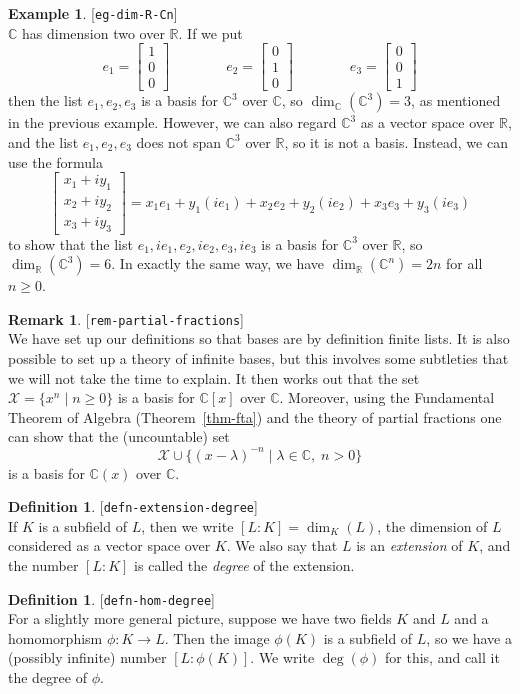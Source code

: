 \documentclass{amsart}
\newcommand{\lbl}[1]{\label{#1}\textup{[\texttt{#1}]}\ \\}
\newcommand{\lbl}{\label}
\newcommand{\R}         {{\mathbb{R}}}
\newcommand{\C}         {{\mathbb{C}}}
\newcommand{\lm}        {\lambda}
\newcommand{\CX}        {{\mathcal{X}}}
\newcommand{\bsm}       {\left[\begin{smallmatrix}}
\newcommand{\esm}       {\end{smallmatrix}\right]}
\newcommand{\st}        {\;|\;}
\renewcommand{\:}{\colon}
\theoremstyle{definition}
\newtheorem{remark}[theorem]{Remark}
\newtheorem{definition}[theorem]{Definition}
\newtheorem{example}[theorem]{Example}
\begin{document}
\begin{example}\lbl{eg-dim-R-Cn}
 $\C$ has dimension two over $\R$.  If we put 
 \[ e_1 = \bsm 1\\ 0\\ 0 \esm \hspace{4em}
    e_2 = \bsm 0\\ 1\\ 0 \esm \hspace{4em}
    e_3 = \bsm 0\\ 0\\ 1 \esm 
 \]
 then the list $e_1,e_2,e_3$ is a basis for $\C^3$ over $\C$, so
 $\dim_\C(\C^3)=3$, as mentioned in the previous example.  However,
 we can also regard $\C^3$ as a vector space over $\R$, and the list
 $e_1,e_2,e_3$ does not span $\C^3$ over $\R$, so it is not a basis.
 Instead, we can use the formula
 \[ \bsm x_1+iy_1\\ x_2+iy_2 \\ x_3+iy_3\esm =
     x_1e_1 + y_1(ie_1) + x_2e_2 + y_2(ie_2) + x_3e_3 + y_3(ie_3)
 \] 
 to show that the list $e_1,ie_1,e_2,ie_2,e_3,ie_3$ is a basis for
 $\C^3$ over $\R$, so $\dim_\R(\C^3)=6$.  In exactly the same way, we
 have $\dim_\R(\C^n)=2n$ for all $n\geq 0$.
\end{example}

\begin{remark}\lbl{rem-partial-fractions}
 We have set up our definitions so that bases are by definition finite
 lists.  It is also possible to set up a theory of infinite bases, but
 this involves some subtleties that we will not take the time to
 explain.  It then works out that the set $\CX=\{x^n\st n\geq 0\}$ is
 a basis for $\C[x]$ over $\C$.  Moreover, using the Fundamental
 Theorem of Algebra (Theorem~\ref{thm-fta}) and the theory of partial
 fractions one can show that the (uncountable) set
 \[ \CX \cup \{(x-\lm)^{-n}\st \lm\in\C,\; n>0\} \]
 is a basis for $\C(x)$ over $\C$.
\end{remark}

\begin{definition}\lbl{defn-extension-degree}
 If $K$ is a subfield of $L$, then we write $[L:K]=\dim_K(L)$, the
 dimension of $L$ considered as a vector space over $K$.  We also say
 that $L$ is an \emph{extension} of $K$, and the number $[L:K]$ is
 called the \emph{degree} of the extension.  
\end{definition}

\begin{definition}\lbl{defn-hom-degree}
 For a slightly more general picture, suppose we have two fields $K$
 and $L$ and a homomorphism $\phi\:K\to L$.  Then the image $\phi(K)$
 is a subfield of $L$, so we have a (possibly infinite) number
 $[L:\phi(K)]$.  We write $\deg(\phi)$ for this, and call it the
 degree of $\phi$.
\end{definition}
\end{document}
